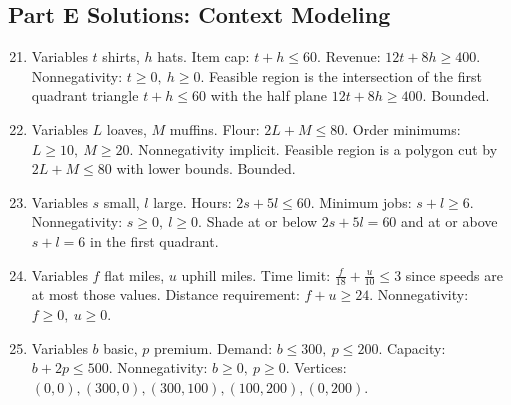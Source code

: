 \documentclass[12pt]{article}
\begin{document}
\subsection*{Part E Solutions: Context Modeling}
\begin{enumerate}
  \setcounter{enumi}{20}
  \item Variables \(t\) shirts, \(h\) hats.  
  Item cap: \(t+h\le60\). Revenue: \(12t+8h\ge400\). Nonnegativity: \(t\ge0,\ h\ge0\).  
  Feasible region is the intersection of the first quadrant triangle \(t+h\le60\) with the half plane \(12t+8h\ge400\). Bounded.

  \item Variables \(L\) loaves, \(M\) muffins.  
  Flour: \(2L+M\le80\). Order minimums: \(L\ge10,\ M\ge20\).  
  Nonnegativity implicit. Feasible region is a polygon cut by \(2L+M\le80\) with lower bounds. Bounded.

  \item Variables \(s\) small, \(l\) large.  
  Hours: \(2s+5l\le60\). Minimum jobs: \(s+l\ge6\). Nonnegativity: \(s\ge0,\ l\ge0\).  
  Shade at or below \(2s+5l=60\) and at or above \(s+l=6\) in the first quadrant.

  \item Variables \(f\) flat miles, \(u\) uphill miles.  
  Time limit: \( \frac{f}{18} + \frac{u}{10} \le 3\) since speeds are at most those values.  
  Distance requirement: \(f+u\ge24\). Nonnegativity: \(f\ge0,\ u\ge0\).

  \item Variables \(b\) basic, \(p\) premium.  
  Demand: \(b\le300,\ p\le200\). Capacity: \(b+2p\le500\). Nonnegativity: \(b\ge0,\ p\ge0\).  
  Vertices: \((0,0), (300,0), (300,100), (100,200), (0,200)\).
\end{enumerate}
\end{document}

